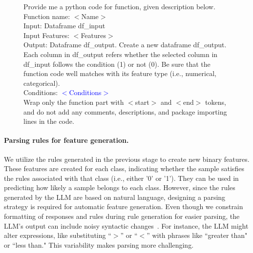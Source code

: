 \begin{figure}[t!]
\begin{tcolorbox}[enhanced,attach boxed title to top center={yshift=-3mm,yshifttext=-1mm},
  colback=black!0!white, colframe=black!20!white, colbacktitle=black!10!white, coltitle=blue!20!black ]
\footnotesize{
Provide me a python code for function, given description below. \\

Function name: $<$Name$>$ \\
Input: Dataframe df\_input \\
Input Features: $<$Features$>$ \\
Output: Dataframe df\_output. Create a new dataframe df\_output. Each column in df\_output refers whether the selected column in df\_input follows the condition (1) or not (0). Be sure that the function code well matches with its feature type (i.e., numerical, categorical). \\

Conditions: \textcolor{blue}{$<$Conditions$>$} \\

Wrap only the function part with $<$start$>$ and $<$end$>$ tokens, and do not add any comments, descriptions, and package importing lines in the code.
}
\end{tcolorbox}
\label{fig:prompt_for_parsing}  
\end{figure}

\paragraph{Parsing rules for feature generation.} We utilize the rules generated in the previous stage to create new binary features. These features are created for each class, indicating whether the sample satisfies the rules associated with that class (i.e., either '0' or '1'). They can be used in predicting how likely a sample belongs to each class. However, since the rules generated by the LLM are based on natural language, designing a parsing strategy is required for automatic feature generation. Even though we constrain formatting of responses and rules during rule generation for easier parsing, the LLM's output can include noisy syntactic changes~\cite{kovavc2023large}. For instance, the LLM might alter expressions, like substituting ``$>$” or ``$<$” with phrases like ``greater than" or ``less than." This variability makes parsing more challenging. 

